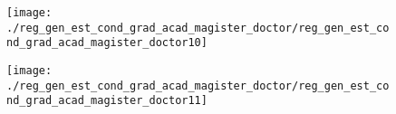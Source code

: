 \begin{figure}[!ht]
    \centering
    \texttt{[image: ./reg\_gen\_est\_cond\_grad\_acad\_magister\_doctor/reg\_gen\_est\_cond\_grad\_acad\_magister\_doctor10]}
\end{figure}
\clearpage

\begin{figure}[!ht]
    \centering
    \texttt{[image: ./reg\_gen\_est\_cond\_grad\_acad\_magister\_doctor/reg\_gen\_est\_cond\_grad\_acad\_magister\_doctor11]}
\end{figure}
\clearpage


